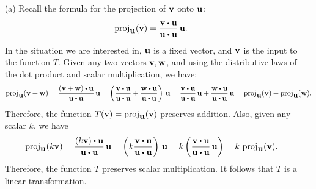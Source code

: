 \begin{solution}
  \begin{enumerate}
  \item[(a)] Recall the formula for the projection of $\mbox{\bf v}$ onto
    $\mbox{\bf u}$:
    \begin{equation*}
      \proj_{\vect{u}}(\vect{v})
      = \frac{\vect{v}\dotprod \vect{u}}{\vect{u}\dotprod \vect{u}}\,\vect{u}.
    \end{equation*}
    In the situation we are interested in, $\mbox{\bf u}$ is a fixed vector,
    and $\mbox{\bf v}$ is the input to the function $T$. Given any two
    vectors $\mbox{\bf v},\mbox{\bf w}$, and using the distributive laws of the dot
    product and scalar multiplication, we have:
    \begin{equation*}
      \proj_{\vect{u}}(\vect{v}+\vect{w})
      = \frac{(\vect{v}+\vect{w})\dotprod \vect{u}}{\vect{u}\dotprod \vect{u}}\,\vect{u}
      = \paren{\frac{\vect{v}\dotprod \vect{u}}{\vect{u}\dotprod \vect{u}}
        + \frac{\vect{w}\dotprod \vect{u}}{\vect{u}\dotprod \vect{u}}}\,\vect{u}
      = \frac{\vect{v}\dotprod \vect{u}}{\vect{u}\dotprod \vect{u}}\,\vect{u}
      + \frac{\vect{w}\dotprod \vect{u}}{\vect{u}\dotprod \vect{u}}\,\vect{u}
      = \proj_{\vect{u}}(\vect{v})
      + \proj_{\vect{u}}(\vect{w}).
    \end{equation*}
    Therefore, the function
    $T(\vect{v}) = \proj_{\vect{u}}(\vect{v})$ preserves
    addition. Also, given any scalar $k$, we have
    \begin{equation*}
      \proj_{\vect{u}}(k\vect{v})
      = \frac{(k\vect{v})\dotprod \vect{u}}{\vect{u}\dotprod \vect{u}}\,\vect{u}
      = \paren{k\frac{\vect{v}\dotprod \vect{u}}{\vect{u}\dotprod \vect{u}}}\,\vect{u}
      = k\paren{\frac{\vect{v}\dotprod \vect{u}}{\vect{u}\dotprod \vect{u}}\,\vect{u}}
      = k\,\proj_{\vect{u}}(\vect{v}).
    \end{equation*}
    Therefore, the function $T$ preserves scalar multiplication. It
    follows that $T$ is a linear transformation.


\end{enumerate}
\end{solution}
